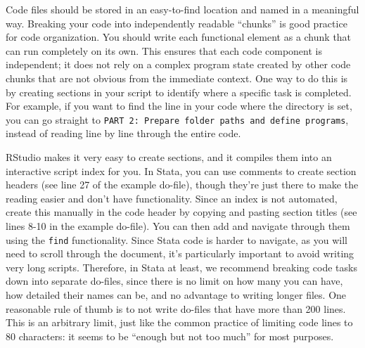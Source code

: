 \documentclass[
]{book}
\begin{document}
Code files should be stored in an easy-to-find location and named in a meaningful way.
Breaking your code into independently readable ``chunks'' is good practice for code organization.
You should write each functional element as a chunk that can run completely on its own.
This ensures that each code component is independent;
it does not rely on a complex program state
created by other code chunks that are not obvious from the immediate context.
One way to do this is by creating sections in your script to identify where a specific task is completed.
For example, if you want to find the line in your code where the directory is set,
you can go straight to \texttt{PART\ 2:\ Prepare\ folder\ paths\ and\ define\ programs},
instead of reading line by line through the entire code.

RStudio makes it very easy to create sections,
and it compiles them into an interactive script index for you.
In Stata, you can use comments to create section headers
(see line 27 of the example do-file),
though they're just there to make the reading easier and don't have functionality.
Since an index is not automated,
create this manually in the code header by copying and pasting section titles
(see lines 8-10 in the example do-file).
You can then add and navigate through them using the \texttt{find} functionality.
Since Stata code is harder to navigate, as you will need to scroll through the document,
it's particularly important to avoid writing very long scripts.
Therefore, in Stata at least, we recommend breaking code tasks down
into separate do-files, since there is no limit on how many you can have,
how detailed their names can be, and no advantage to writing longer files.
One reasonable rule of thumb is to not write do-files that have more than 200 lines.
This is an arbitrary limit, just like the common practice of limiting code lines to 80 characters:
it seems to be ``enough but not too much'' for most purposes.
\end{document}
